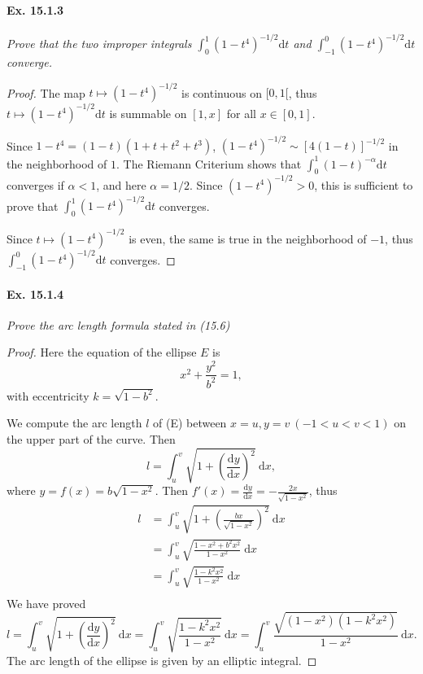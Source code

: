 \documentclass[11pt,a4paper]{article}
\newcommand{\D}{\mathrm{d}}
\begin{document}
\paragraph{Ex. 15.1.3}{\it Prove that the two improper integrals $\int_0^1 (1-t^4)^{-1/2} \mathrm{d}t$ and $\int_{-1}^0 (1-t^4)^{-1/2} \mathrm{d}t$ converge.
}
\begin{proof}
 The map $t \mapsto (1-t^4)^{-1/2}$ is continuous on $[0,1[$, thus $t \mapsto(1-t^4)^{-1/2} \mathrm{d}t$ is summable on $[1,x]$ for all $x \in [0,1]$.  

Since $1-t^4 = (1-t)(1+t+t^2+t^3)$, $(1-t^4)^{-1/2} \sim [4(1-t)]^{-1/2}$ in the neighborhood of $1$. The Riemann Criterium shows that $\int_0^1 (1-t)^{-\alpha} \mathrm{d}t$ converges if  $\alpha  < 1$, and here $\alpha = 1/2$. Since $(1-t^4)^{-1/2} >0$, this is sufficient to prove that $\int_0^1 (1-t^4)^{-1/2} \mathrm{d}t$ converges.

Since $t \mapsto (1-t^4)^{-1/2}$ is even, the same is true in the neighborhood of $-1$, thus $\int_{-1}^0 (1-t^4)^{-1/2} \mathrm{d}t$ converges.
\end{proof}

\paragraph{Ex. 15.1.4}{\it  Prove the arc length formula stated in (15.6)}
\begin{proof}
 Here the equation of the ellipse $E$ is
 $$x^2 + \frac{y^2}{b^2} = 1,$$
 with eccentricity $k = \sqrt{1- b^2}$.

We compute the arc length $l$ of (E) between $x = u, y=v\ (-1<u<v<1)$ on the upper part of the curve. Then
$$l =  \int_u^v \sqrt{1+\left( \frac{\D y}{\D x}\right)^2}\  \D x,$$
where $y = f(x) = b \sqrt{1-x^2}.$ Then $f'(x) =  \frac{\D y}{\D x }= -\frac{2x}{\sqrt{1-x^2}}$, thus
\begin{align*}
l &=  \int_u^v \sqrt{1+\left(\frac{bx}{\sqrt{1-x^2}}\right)^2}\  \D x\\
&=\int_u^v \sqrt{\frac{1 - x^2 + b^2 x^2}{1-x^2}}\  \D x\\
&=\int_u^v \sqrt{\frac{1 - k^2 x^2}{1-x^2}}\  \D x\\
\end{align*}
We have proved
$$l =  \int_u^v \sqrt{1+\left( \frac{\D y}{\D x}\right)^2}\  \D x = \int_u^v \sqrt{\frac{1 - k^2 x^2}{1-x^2}}\  \D x = \int_u^v \frac{\sqrt{(1-x^2)(1 - k^2 x^2)}}{1-x^2}\  \D x.$$
The arc length of the ellipse is given by an elliptic integral.
\end{proof}
\end{document}
